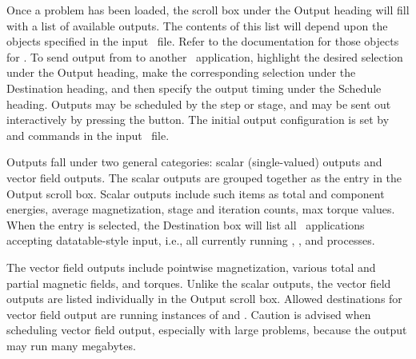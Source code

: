 Once a problem has been loaded, the scroll box under the Output
heading will fill with a list of available outputs.  The contents of
this list will depend upon the  objects specified in the
input \MIF\ file.  Refer to the documentation for those objects for
.
To send output from  to another \OOMMF\ application, highlight the
desired selection under the Output heading, make the corresponding
selection under the Destination heading, and then specify the output
timing under the Schedule heading.  Outputs may be scheduled by the
step or stage, and may be sent out interactively by pressing the
 button.  The initial output configuration is set by
 and
 commands in the input
\MIF\ file.

Outputs fall under two general categories: scalar (single-valued)
outputs and vector field outputs.  The scalar outputs are grouped
together as the  entry in the Output scroll box.
Scalar outputs include such items as total and component energies,
average magnetization, stage and iteration counts, max torque values.
When the  entry is selected, the Destination box will
list all \OOMMF\ applications accepting datatable-style input, i.e., all
currently running
,
, and
 processes.

The vector field outputs include pointwise magnetization, various total
and partial magnetic fields, and torques.  Unlike the scalar
outputs, the vector field outputs are listed individually in the Output
scroll box.  Allowed destinations for vector field output are running
instances of
 and
.  Caution is
advised when scheduling vector field output, especially with large
problems, because the output may run many megabytes.

